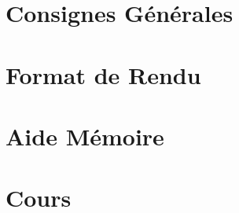 \documentclass[12pt,a4paper]{article}
\begin{document}
\maketitle





\newpage

\tableofcontents

\newpage

\section{Consignes Générales}

\bigskip



\newpage

\section{Format de Rendu}
\label{sec:FormatDeRendu}

\vspace*{1cm}



\newpage

\section{Aide Mémoire}
\label{sec:AideMemoire}

\vspace*{1cm}



\newpage


\section{Cours}

\vspace*{0.7cm}



\newpage

\end{document}
